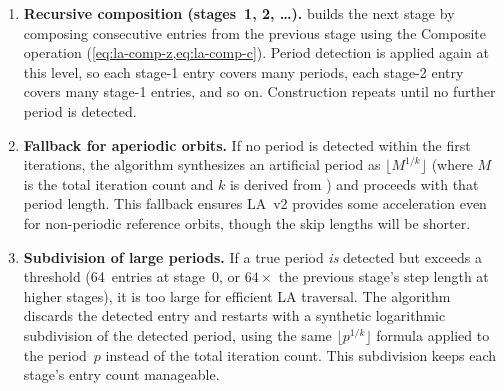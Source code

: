 \begin{enumerate}
\begin{itemize}
          \item \textbf{Method~2 (coefficient ratio).}  A period is
                detected when the threshold tightening at the current
                step exceeds a fraction of the existing threshold:
                \begin{multline}
                \frac{\lVert z_k^\star \rVert_\infty}
                     {\lVert \code{ZCoeff}_k \rVert_\infty}
                \cdot \code{LAThresholdScale} \\
                < \code{LAThreshold}_k
                  \cdot \code{Stage0PeriodDetectionThreshold}.
                \label{eq:period-detect-coeff}
                \end{multline}
                This variant reuses the threshold machinery directly.
        \end{itemize}
        For higher stages (stage~1 and above), the same tests are
        applied during the Composite pass, with separate threshold
        constants  and
         (typically looser than the
        stage-0 variants).

  \item \textbf{Recursive composition (stages~1, 2, \ldots).}
         builds the next stage by composing
        consecutive entries from the previous stage using the Composite
        operation (\cref{eq:la-comp-z,eq:la-comp-c}).  Period detection
        is applied again at this level, so each stage-1 entry covers
        many periods, each stage-2 entry covers many stage-1 entries,
        and so on.  Construction repeats until no further period is
        detected.

  \item \textbf{Fallback for aperiodic orbits.}  If no period is
        detected within the first  iterations, the
        algorithm synthesizes an artificial period as
        \(\lfloor M^{1/k}\rfloor\) (where \(M\) is the total iteration
        count and \(k\) is derived from ) and
        proceeds with that period length.  This fallback ensures LA~v2 provides
        some acceleration even for non-periodic reference orbits,
        though the skip lengths will be shorter.

  \item \textbf{Subdivision of large periods.}  If a true period
        \emph{is} detected but exceeds a threshold (64~entries at
        stage~0, or \(64 \times\) the previous stage's step length at
        higher stages), it is too large for efficient LA traversal.
        The algorithm discards the detected entry and restarts with a
        synthetic logarithmic subdivision of the detected period,
        using the same \(\lfloor p^{1/k}\rfloor\) formula applied to
        the period~\(p\) instead of the total iteration count.
        This subdivision keeps each stage's entry count manageable.
\end{enumerate}

